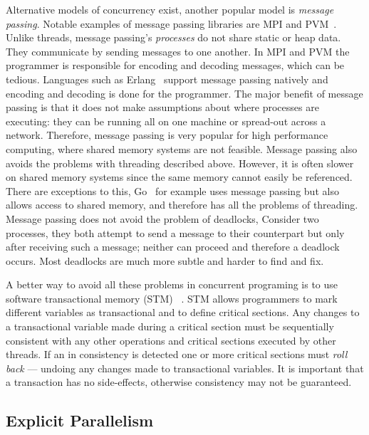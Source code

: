 Alternative models of concurrency exist,
another popular model is \emph{message passing}.
Notable examples of message passing libraries are MPI\citep{mpi} and
PVM~\citep{pvm}.
Unlike threads, message passing's \emph{processes} do not share static or heap data.
They communicate by sending messages to one another.
In MPI and PVM the programmer is responsible for encoding and decoding messages,
which can be tedious.
Languages such as Erlang~\citep{erlang} support message passing natively and
encoding and decoding is done for the programmer.
The major benefit of message passing is that it does not make assumptions about where processes
are executing:
they can be running all on one machine or spread-out across a network.
Therefore, message passing is very popular for high performance computing,
where shared memory systems are not feasible.
Message passing also avoids the problems with threading described above.
However,
it is often slower on shared memory systems since the same memory cannot easily
be referenced.
There are exceptions to this,
Go~\citep{balbaert:2012:go} for example uses message passing but also allows
access to shared memory,
and therefore has all the problems of threading.
Message passing does not avoid the problem of deadlocks,
Consider two processes,
they both attempt to send a message to their counterpart but only after
receiving such a message;
neither can proceed and therefore a deadlock occurs.
Most deadlocks are much more subtle and harder to find and fix.

A better way to avoid all these problems in concurrent programing is to use
software transactional memory (STM)~%
\citep{harris:2005:haskell-stm,mika:mercury-stm}.
STM allows programmers to mark different variables as transactional
and to define critical sections.
Any changes to a transactional variable made during a critical section must
be sequentially consistent with any other operations and critical
sections executed by other threads.
If an in consistency is detected one or more critical sections must
\emph{roll back} --- undoing any changes made to transactional
variables.
It is important that a transaction has no side-effects, otherwise
consistency may not be guaranteed.


\subsection{Explicit Parallelism}
\label{sec:back_par_explicit}

